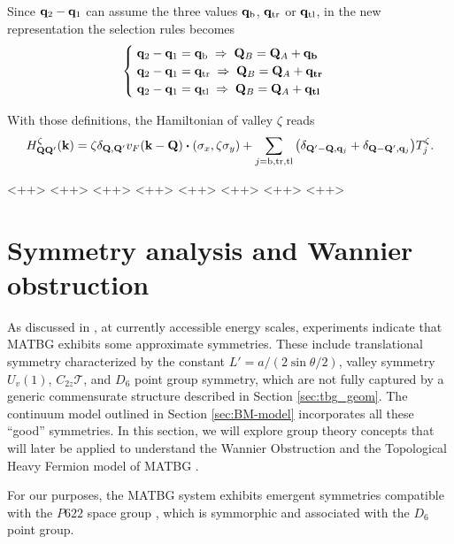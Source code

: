 Since ${\vb{q}}_2 - {\vb{q}}_1$ can assume the three values ${\vb{q}}_{\text{b}}$, ${\vb{q}}_{\text{tr}}$ or ${\vb{q}}_{\text{tl}}$, in the new representation the selection rules becomes
\begin{align} \label{eq:selection_rules_qbqtrqtl_QAQB}
\begin{cases}
\; {\vb{q}}_2-{\vb{q}}_1={\vb{q}}_{\text{b}}  \; \Rightarrow \; {\vb{Q}}_B = {\vb{Q}}_A + {\vb{q}}_{\textbf{b}} \\
\; {\vb{q}}_2-{\vb{q}}_1={\vb{q}}_{\text{tr}} \; \Rightarrow \; {\vb{Q}}_B = {\vb{Q}}_A + {\vb{q}}_{\textbf{tr}} \\
\; {\vb{q}}_2-{\vb{q}}_1={\vb{q}}_{\text{tl}} \; \Rightarrow \; {\vb{Q}}_B = {\vb{Q}}_A + {\vb{q}}_{\textbf{tl}}
\end{cases}
\end{align}

With those definitions, the Hamiltonian of valley $\zeta$ reads
\begin{equation} \label{eq:mbm-1v}
H^\zeta_{\Q\Q'}(\k) = \zeta \delta_{\Q,\Q'} v_F (\k - \Q) \vdot (\s_x, \zeta \s_y) +
\sum_{j = \text{b},\text{tr},\text{tl}} \qty(\delta_{\Q'-\Q,\q_j} + \delta_{\Q-\Q',\q_j}) T_{j}^\zeta.
\end{equation}

<++> <++> <++> <++> <++> <++> <++> <++>

\section{Symmetry analysis and Wannier obstruction} \label{sec:wannier_obstruction}

As discussed in \cite{zou2018}, at currently accessible energy scales, experiments indicate that MATBG exhibits some approximate symmetries. These include translational symmetry characterized by the constant $L' = a / (2 \sin\theta/2)$, valley symmetry $U_v(1)$, $C_{2z} \mathcal{T}$, and $D_6$ point group symmetry, which are not fully captured by a generic commensurate structure described in Section \ref{sec:tbg_geom}. The continuum model outlined in Section \ref{sec:BM-model} incorporates all these ``good'' symmetries. In this section, we will explore group theory concepts that will later be applied to understand the Wannier Obstruction \cite{zou2018} and the Topological Heavy Fermion model of MATBG \cite{topoheavyfermion2022}.

For our purposes, the MATBG system exhibits emergent symmetries compatible with the $P622$ space group \cite{thesis_rennella}, which is symmorphic and associated with the $D_6$ point group.

